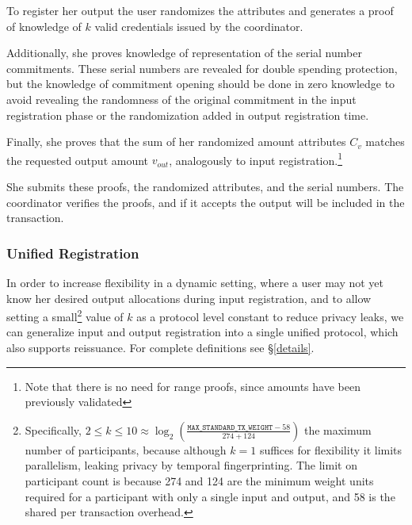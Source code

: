 \documentclass{article}
\begin{document}
To register her output the user randomizes the attributes and generates a proof of knowledge of $k$ valid credentials issued by the coordinator.

Additionally, she proves knowledge of representation of the serial number commitments. These serial numbers are revealed for double spending protection, but the knowledge of commitment opening should be done in zero knowledge to avoid revealing the randomness of the original commitment in the input registration phase or the randomization added in output registration time.

Finally, she proves that the sum of her randomized amount attributes $C_v$ matches the requested output amount $v_{\mathit{out}}$, analogously to input registration.\footnote{Note that there is no need for range proofs, since amounts have been previously validated}

She submits these proofs, the randomized attributes, and the serial numbers. The coordinator verifies the proofs, and if it accepts the output will be included in the transaction.

\subsubsection{Unified Registration}\label{unified}

In order to increase flexibility in a dynamic setting, where a user may not yet know her desired output allocations during input registration, and to allow setting a small\footnote{Specifically, $2 \le k \le 10 \approx \log_2\left(\frac{\mathtt{MAX\_STANDARD\_TX\_WEIGHT} - 58}{274 + 124}\right)$ the maximum number of participants, because although $k=1$ suffices for flexibility it limits parallelism, leaking privacy by temporal fingerprinting. The limit on participant count is because 274 and 124 are the minimum weight units required for a participant with only a single input and output, and 58 is the shared per transaction overhead.} value of $k$ as a protocol level constant to reduce privacy leaks, we can generalize input and output registration into a single unified protocol, which also supports reissuance. 
For complete definitions see \S\ref{details}.
\end{document}
